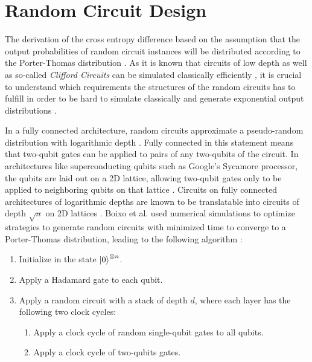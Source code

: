 \section{Random Circuit Design}
\label{sec:random_circuit_design}

The derivation of the cross entropy difference based on the assumption that the
output probabilities of random circuit instances will be distributed according to
the Porter-Thomas distribution \cite{Boixo2018supremacy}. As it is known that circuits of low depth as
well as so-called \textit{Clifford Circuits} can be simulated classically
efficiently \cite{gottesman1998heisenberg}, it is crucial to understand which requirements the structures of
the random circuits has to fulfill in order to be hard to simulate classically and generate
exponential output distributions \cite{Boixo2018supremacy}.

In a fully connected architecture, random circuits approximate a pseudo-random
distribution with logarithmic depth \cite{harrow2008random}. Fully connected in this statement means
that two-qubit gates can be applied to pairs of any two-qubits of the circuit. In
architectures like superconducting qubits such as Google's Sycamore
processor, the qubits are laid out on a 2D lattice, allowing two-qubit gates only
to be applied to neighboring qubits on that lattice \cite{barends2014logic}. Circuits on fully
connected architectures of logarithmic depths are known to be translatable into
circuits of depth $\sqrt{n}$ on 2D lattices \cite{beals2013efficient}. Boixo et al. used numerical
simulations to optimize strategies to generate random circuits with minimized
time to converge to a Porter-Thomas distribution, leading to the following algorithm \cite{Boixo2018supremacy}:

\begin{enumerate}
  \item Initialize in the state $\Ket{0}^{\otimes n}$.
  \item Apply a Hadamard gate to each qubit.
  \item Apply a random circuit with a stack of depth $d$, where each layer has
    the following two clock cycles:
    \begin{enumerate}
      \item Apply a clock cycle of random single-qubit gates to all qubits.
        \item Apply a clock cycle of two-qubits gates.
    \end{enumerate}
\end{enumerate}

